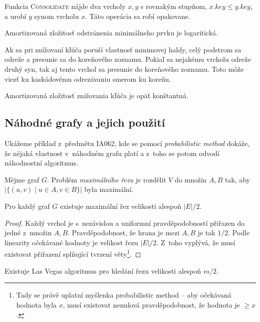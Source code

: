 Funkcia \textsc{Consolidate} nájde dva vrcholy $x,y$ s rovnakým stupňom,
$x.key \leq y.key$, a urobí $y$ synom vrcholu $x$. Táto operácia
sa robí opakovane.

Amortizovaná zložitosť odstránenia minimálneho prvku je logaritická.

Ak sa pri znížovaní kľúča poruší vlastnosť minimovej haldy,
celý podstrom sa odreže a presunie sa do koreňového zoznamu.
Pokiaľ sa nejakému vrcholu odreže druhý syn, tak aj tento vrchol
sa presunie do koreňového zoznamu. Toto môže viezť ku kaskádovému
odrezávaniu smerom ku koreňu.

Amortizovaná zložitosť znižovania kľúča je opäť konštantná.



\subsection{Náhodné grafy a jejich použití}

Ukážeme příklad z~předmětu IA062, kde se pomocí {\em probabilistic
method} dokáže, že nějaká vlastnost v~náhodném grafu platí a z~toho se
potom odvodí náhodnostní algoritmus.


\begin{definition}
    Mějme graf $G$. Problém {\em maximálního řezu} je rozdělit $V$ do
    množin $A, B$ tak, aby $\lvert \{ (u,v) \mid u \in A, v \in B \}
    \rvert$ byla maximální.
\end{definition}

\begin{theorem}
    Pro každý graf $G$ existuje maximální řez velikosti alespoň
    $\lvert E \rvert / 2$.
\end{theorem}

\begin{proof}
    Každý vrchol je s~nezávislou a uniformní pravděpodobností přiřazen
    do jedné z~množin $A, B$. Pravděpodobnost, že hrana je mezi $A, B$
    je tak $1/2$. Podle linearity očekávané hodnoty je velikost řezu
    $\lvert E \rvert / 2$. Z~toho vyplývá, že musí existovat přiřazení
    splňující tvrzení věty\footnote{Tady se právě uplatní myšlenka
    probabilistic method -- aby očekávaná hodnota byla $x$, musí
    existovat nenulová pravděpodobnost, že hodnota je $\geq x$.}.
\end{proof}

\begin{theorem}
    Existuje Las Vegas algoritmus pro hledání řezu velikosti alespoň
    $m/2$.
\end{theorem}

